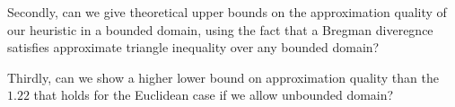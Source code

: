 \documentclass[11pt]{myclass}
\begin{document}
Secondly, can we give theoretical upper bounds on the approximation quality of our heuristic in a bounded domain, using the fact that a Bregman diveregnce satisfies approximate triangle inequality over any bounded domain?

Thirdly, can we show a higher lower bound on approximation quality than the $1.22$ that holds for the Euclidean case if we allow unbounded domain?

\newpage


\end{document}
